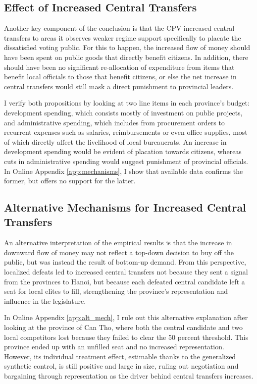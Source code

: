 \documentclass[12pt]{article}
\newcommand{\1}{\mathbbm{1}}
\begin{document}
\subsection*{Effect of Increased Central Transfers}

Another key component of the conclusion is that the CPV increased central transfers to areas it observes weaker regime support specifically to placate the dissatisfied voting public. For this to happen, the increased flow of money should have been spent on public goods that directly benefit citizens. In addition, there should have been no significant re-allocation of expenditure from items that benefit local officials to those that benefit citizens, or else the net increase in central transfers would still mask a direct punishment to provincial leaders. 

I verify both propositions by looking at two line items in each province's budget: development spending, which consists mostly of investment on public projects, and administrative spending, which includes from procurement orders to recurrent expenses such as salaries, reimbursements or even office supplies, most of which directly affect the livelihood of local bureaucrats. An increase in development spending would be evident of placation towards citizens, whereas cuts in administrative spending would suggest punishment of provincial officials. In Online Appendix \ref{app:mechanisms}, I show that available data confirms the former, but offers no support for the latter.

\subsection*{Alternative Mechanisms for Increased Central Transfers}

An alternative interpretation of the empirical results is that the increase in downward flow of money may not reflect a top-down decision to buy off the public, but was instead the result of bottom-up demand. From this perspective, localized defeats led to increased central transfers not because they sent a signal from the provinces to Hanoi, but because each defeated central candidate left a seat for local elites to fill, strengthening the province's representation and influence in the legislature. 

In Online Appendix \ref{app:alt_mech}, I rule out this alternative explanation after looking at the province of Can Tho, where both the central candidate and two local competitors lost because they failed to clear the 50 percent threshold. This province ended up with an unfilled seat and no increased representation. However, its individual treatment effect, estimable thanks to the generalized synthetic control, is still positive and large in size, ruling out negotiation and bargaining through representation as the driver behind central transfers increases.
\end{document}
